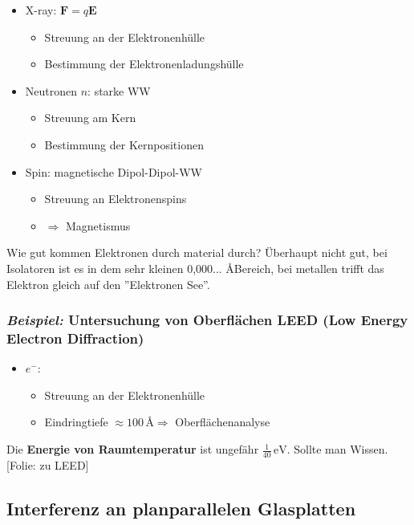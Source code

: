\documentclass[titlepage,11pt,a4paper,ngerman]{report}
\newcommand{\tx}[1]{\textrm{#1}}
\newcommand{\folie}[1]{\color{gray}[Folie: #1]\color{black}}
\renewcommand{\vec}[1]{\boldsymbol{#1}}
\newcommand{\lcom}[1]{\color{MidnightBlue}#1\color{black}}
\begin{document}
\begin{itemize}
	\item X-ray: $ \vec{F} = q \vec{E} $
	\begin{itemize}
		\item Streuung an der Elektronenhülle
		\item Bestimmung der Elektronenladungshülle
	\end{itemize}
	\item Neutronen $n$: starke WW
	\begin{itemize}
		\item Streuung am Kern
		\item Bestimmung der Kernpositionen
	\end{itemize}
	\item Spin: magnetische Dipol-Dipol-WW
	\begin{itemize}
		\item Streuung an Elektronenspins
		\item $ \Rightarrow $ Magnetismus
	\end{itemize}
\end{itemize}
\lcom{Wie gut kommen Elektronen durch material durch? Überhaupt nicht gut, bei Isolatoren ist es in dem sehr kleinen 0,000... \AA Bereich, bei metallen trifft das Elektron gleich auf den ''Elektronen See''.}

\subsubsection{\emph{Beispiel:} \textbf{Untersuchung von Oberflächen LEED} (Low Energy Electron Diffraction)}

\begin{itemize}
	\item $ e^- $:
	\begin{itemize}
		\item Streuung an der Elektronenhülle
		\item Eindringtiefe $ \approx 100 \, \tx{\AA} \Rightarrow $ Oberflächenanalyse
	\end{itemize}
\end{itemize}
\lcom{Die \textbf{Energie von Raumtemperatur} ist ungefähr $ \frac{1}{40} \, \tx{eV} $. Sollte man Wissen.}\\
\folie{zu LEED}

\subsection{Interferenz an planparallelen Glasplatten}
\end{document}
